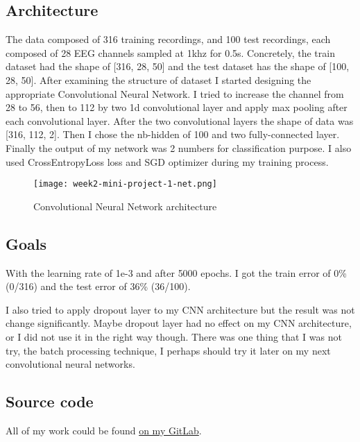 \subsection{Architecture}
The data composed of 316 training recordings, and 100 test recordings, each composed of 28 EEG channels sampled at 1khz for 0.5s. Concretely, the train dataset had the shape of [316, 28, 50] and the test dataset has the shape of [100, 28, 50]. After examining the structure of dataset I started designing the appropriate Convolutional Neural Network. I tried to increase the channel from 28 to 56, then to 112 by two 1d convolutional layer and apply max pooling after each convolutional layer. After the two convolutional layers the shape of data was [316, 112, 2]. Then I chose the nb-hidden of 100 and two fully-connected layer. Finally the output of my network was 2 numbers for classification purpose. I also used CrossEntropyLoss loss and SGD optimizer during my training process.

\begin{figure}[!ht]
\centering
\texttt{[image: week2-mini-project-1-net.png]}
\caption{Convolutional Neural Network architecture}
\end{figure}


\subsection{Goals}
With the learning rate of 1e-3 and after 5000 epochs. I got the train error of 0\% (0/316) and the test error of 36\% (36/100).

I also tried to apply dropout layer to my CNN architecture but the result was not change significantly. Maybe dropout layer had no effect on my CNN architecture, or I did not use it in the right way though. There was one thing that I was not try, the batch processing technique, I perhaps should try it later on my next convolutional neural networks. 

\subsection{Source code}
All of my work could be found \href{https://gitlab.com/tlvu2697/epfl--ee559--deep-learning/blob/master/practical/mini-project-1.py}{on my GitLab}.